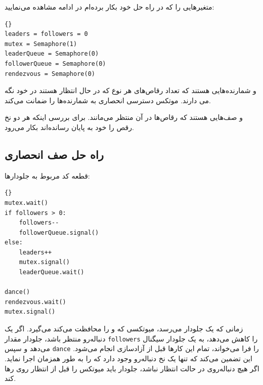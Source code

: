 \documentclass{book}
\newcommand{\clearemptydoublepage}{\newpage\cleardoublepage}
\begin{document}
    متغیرهایی را که در راه حل خود بکار برده‌ام در ادامه مشاهده می‌نمایید:

\begin{latin}
\begin{latin}
\begin{lstlisting}[title={\rl{راهنمای صف}}]{}
leaders = followers = 0
mutex = Semaphore(1)
leaderQueue = Semaphore(0)
followerQueue = Semaphore(0)
rendezvous = Semaphore(0)
\end{lstlisting}
\end{latin}
\end{latin}

     و 
    شمارنده‌هایی هستند که تعداد رقاص‌های هر نوع که در حال انتظار هستند در خود نگه می دارند. 
    موتکس دسترسی انحصاری به شمارنده‌ها را ضمانت می‌کند.

     و 
صف‌هایی هستند که رقاص‌ها در آن  منتظر می‌مانند. 
 برای بررسی اینکه هر دو نخ رقص را خود به پایان‌ رسانده‌اند بکار می‌رود. 


\clearemptydoublepage
\subsection {راه حل صف انحصاری}

    قطعه کد مربوط به جلو‌دارها:

\begin{latin}
\begin{latin}
\begin{lstlisting}[title=\rl{راه حل صف (جلودارها)}]{}
mutex.wait()
if followers > 0:
    followers--
    followerQueue.signal()
else:
    leaders++
    mutex.signal()
    leaderQueue.wait()    

dance()
rendezvous.wait()
mutex.signal()
\end{lstlisting}
\end{latin}
\end{latin}

    زمانی که یک جلو‌دار می‌رسد، میوتکسی که   و  را محافظت می‌کند می‌گیرد. 
    اگر یک دنباله‌رو منتظر باشد، جلو‌دار مقدار {\tt followers} را کاهش می‌دهد،  به یک جلو‌دار سیگنال می‌دهد و سپس {\tt dance} را فرا می‌خواند، 
    تمام این‌ کارها  قبل از آزادسازی  انجام می‌شود. 
    این تضمین می‌کند که تنها یک نخ دنباله‌رو وجود دارد که  را به طور همزمان اجرا نماید. 
    اگر هیچ دنباله‌روی در حالت انتظار نباشد، جلو‌دار باید میوتکس را قبل از انتظار روی  رها کند. 
\end{document}
